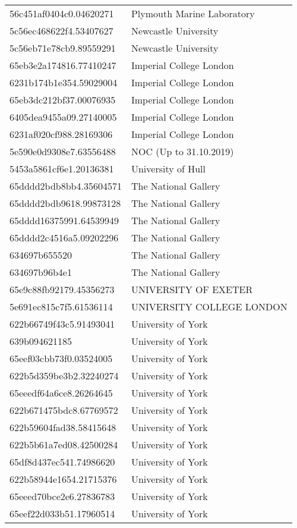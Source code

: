 \begin{tabular}{ll}
56c451af0404c0.04620271 & Plymouth Marine Laboratory \\
5c56ec468622f4.53407627 & Newcastle University \\
5c56eb71e78cb9.89559291 & Newcastle University \\
65eb3e2a174816.77410247 & Imperial College London \\
6231b174b1e354.59029004 & Imperial College London \\
65eb3dc212bf37.00076935 & Imperial College London \\
6405dea9455a09.27140005 & Imperial College London \\
6231af020cf988.28169306 & Imperial College London \\
5e590e0d9308e7.63556488 & NOC (Up to 31.10.2019) \\
5453a5861cf6e1.20136381 & University of Hull \\
65dddd2bdb8bb4.35604571 & The National Gallery \\
65dddd2bdb9618.99873128 & The National Gallery \\
65dddd16375991.64539949 & The National Gallery \\
65dddd2c4516a5.09202296 & The National Gallery \\
634697b655520 & The National Gallery \\
634697b96b4e1 & The National Gallery \\
65e9c88fb92179.45356273 & UNIVERSITY OF EXETER \\
5e691ec815c7f5.61536114 & UNIVERSITY COLLEGE LONDON \\
622b66749f43c5.91493041 & University of York \\
639b094621185 & University of York \\
65eef03cbb73f0.03524005 & University of York \\
622b5d359be3b2.32240274 & University of York \\
65eeedf64a6ce8.26264645 & University of York \\
622b671475bdc8.67769572 & University of York \\
622b59604fad38.58415648 & University of York \\
622b5b61a7ed08.42500284 & University of York \\
65df8d437ec541.74986620 & University of York \\
622b58944e1654.21715376 & University of York \\
65eeed70bce2e6.27836783 & University of York \\
65eef22d033b51.17960514 & University of York \\

\end{tabular}
